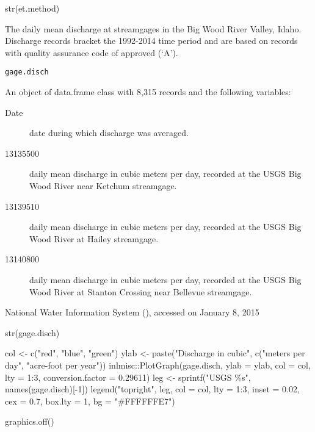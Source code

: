 \documentclass[a4paper]{book}
\begin{document}
%
\begin{Examples}
\begin{ExampleCode}
str(et.method)

\end{ExampleCode}
\end{Examples}
%
\begin{Description}\relax
The daily mean discharge at streamgages in the Big Wood River Valley, Idaho.
Discharge records bracket the 1992-2014 time period and are based on
records with quality assurance code of approved (`A').
\end{Description}
%
\begin{Usage}
\begin{verbatim}
gage.disch
\end{verbatim}
\end{Usage}
%
\begin{Format}
An object of data.frame class with 8,315 records and the following variables:
\begin{description}

\item[Date] date during which discharge was averaged.
\item[13135500] daily mean discharge in cubic meters per day, recorded at the USGS
Big Wood River near Ketchum streamgage.
\item[13139510] daily mean discharge in cubic meters per day, recorded at the USGS
Big Wood River at Hailey streamgage.
\item[13140800] daily mean discharge in cubic meters per day, recorded at the USGS
Big Wood River at Stanton Crossing near Bellevue streamgage.

\end{description}
\end{Format}
%
\begin{Source}\relax
National Water Information System (),
accessed on January 8, 2015
\end{Source}
%
\begin{Examples}
\begin{ExampleCode}
str(gage.disch)

col <- c("red", "blue", "green")
ylab <- paste("Discharge in cubic", c("meters per day", "acre-foot per year"))
inlmisc::PlotGraph(gage.disch, ylab = ylab, col = col, lty = 1:3,
                   conversion.factor = 0.29611)
leg <- sprintf("USGS \%s", names(gage.disch)[-1])
legend("topright", leg, col = col, lty = 1:3, inset = 0.02, cex = 0.7,
       box.lty = 1, bg = "#FFFFFFE7")

graphics.off()

\end{ExampleCode}
\end{Examples}
\end{document}
